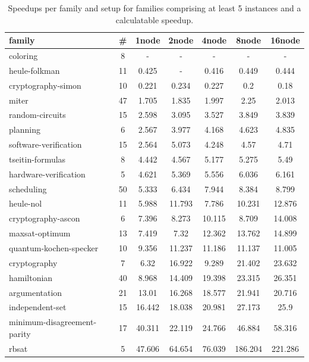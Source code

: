 \documentclass[12pt,a4paper,twoside]{scrartcl}
\numberwithin{equation}{section}
\begin{document}
\begin{table}
  \center
  \begin{tabular}{ lcccccc }
    \toprule
    family	&	\#	&	1node	&	2node	&	4node	&	8node	&	16node\\
    \midrule
    coloring	&	8	&	-	&	-	&	-	&	-	&	-\\
    heule-folkman	&	11	&	0.425	&	-	&	0.416	&	0.449	&	0.444\\
    cryptography-simon	&	10	&	0.221	&	0.234	&	0.227	&	0.2	&	0.18\\
    miter	&	47	&	1.705	&	1.835	&	1.997	&	2.25	&	2.013\\
    random-circuits	&	15	&	2.598	&	3.095	&	3.527	&	3.849	&	3.839\\
    planning	&	6	&	2.567	&	3.977	&	4.168	&	4.623	&	4.835\\
    software-verification	&	15	&	2.564	&	5.073	&	4.248	&	4.57	&	4.71\\
    tseitin-formulas	&	8	&	4.442	&	4.567	&	5.177	&	5.275	&	5.49\\
    hardware-verification	&	5	&	4.621	&	5.369	&	5.556	&	6.036	&	6.161\\
    scheduling	&	50	&	5.333	&	6.434	&	7.944	&	8.384	&	8.799\\
    heule-nol	&	11	&	5.988	&	11.793	&	7.786	&	10.231	&	12.876\\
    cryptography-ascon	&	6	&	7.396	&	8.273	&	10.115	&	8.709	&	14.008\\
    maxsat-optimum	&	13	&	7.419	&	7.32	&	12.362	&	13.762	&	14.899\\
    quantum-kochen-specker	&	10	&	9.356	&	11.237	&	11.186	&	11.137	&	11.005\\
    cryptography	&	7	&	6.32	&	16.922	&	9.289	&	21.402	&	23.632\\
    hamiltonian	&	40	&	8.968	&	14.409	&	19.398	&	23.315	&	26.351\\
    argumentation	&	21	&	13.01	&	16.268	&	18.577	&	21.941	&	20.716\\
    independent-set	&	15	&	16.442	&	18.038	&	20.981	&	27.173	&	25.9\\
    minimum-disagreement-parity	&	17	&	40.311	&	22.119	&	24.766	&	46.884	&	58.316\\
    rbsat	&	5	&	47.606	&	64.654	&	76.039	&	186.204	&	221.286\\
    \bottomrule
  \end{tabular}
  \caption{Speedups per family and setup for families comprising at least 5 instances and a calculatable speedup.}
  \label{tab:speedupsSignificantFamilies}
\end{table}
\end{document}
